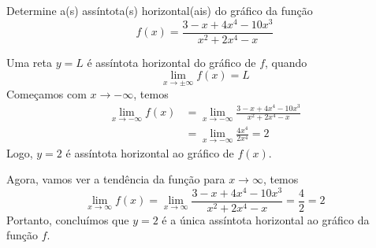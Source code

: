 \cleardoublepage\documentclass[../main.tex]{subfiles}
\begin{document}
\begin{exeresol}
  Determine a(s) assíntota(s) horizontal(ais) do gráfico da função
  \begin{equation*}
    f(x) = \frac{3 - x + 4x^4 - 10x^3}{x^2 + 2x^4 -x}
  \end{equation*}
\end{exeresol}
\begin{resol}
  Uma reta $y = L$ é assíntota horizontal do gráfico de $f$, quando
  \begin{equation*}
    \lim_{x\to\pm\infty} f(x) = L
  \end{equation*}
  Começamos com $x\to-\infty$, temos
  \begin{align*}
    \lim_{x\to-\infty} f(x) &= \lim_{x\to-\infty} \frac{3 - x + 4x^4 - 10x^3}{x^2 + 2x^4 -x} \\
                            &= \lim_{x\to -\infty} \frac{4x^4}{2x^4} = 2
  \end{align*}
  Logo, $y=2$ é assíntota horizontal ao gráfico de $f(x)$.

  Agora, vamos ver a tendência da função para $x\to\infty$, temos
  \begin{equation*}
    \lim_{x\to\infty} f(x) = \lim_{x\to\infty} \frac{3 - x + 4x^4 - 10x^3}{x^2 + 2x^4 -x} = \frac{4}{2} = 2
  \end{equation*}
  Portanto, concluímos que $y=2$ é a única assíntota horizontal ao gráfico da função $f$.
\end{resol}
\end{document}
